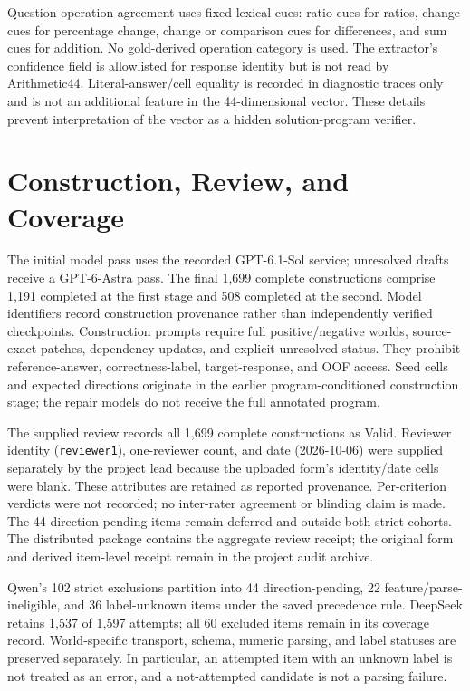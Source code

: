 Question-operation agreement uses fixed lexical cues: ratio cues for ratios, change cues for percentage change, change or comparison cues for differences, and sum cues for addition. No gold-derived operation category is used. The extractor's confidence field is allowlisted for response identity but is not read by Arithmetic44. Literal-answer/cell equality is recorded in diagnostic traces only and is not an additional feature in the 44-dimensional vector. These details prevent interpretation of the vector as a hidden solution-program verifier.

\section{Construction, Review, and Coverage}
\label{app:construction}
The initial model pass uses the recorded GPT-6.1-Sol service; unresolved drafts receive a GPT-6-Astra pass. The final 1,699 complete constructions comprise 1,191 completed at the first stage and 508 completed at the second. Model identifiers record construction provenance rather than independently verified checkpoints. Construction prompts require full positive/negative worlds, source-exact patches, dependency updates, and explicit unresolved status. They prohibit reference-answer, correctness-label, target-response, and OOF access. Seed cells and expected directions originate in the earlier program-conditioned construction stage; the repair models do not receive the full annotated program.

The supplied review records all 1,699 complete constructions as Valid. Reviewer identity (\texttt{reviewer1}), one-reviewer count, and date (2026-10-06) were supplied separately by the project lead because the uploaded form's identity/date cells were blank. These attributes are retained as reported provenance. Per-criterion verdicts were not recorded; no inter-rater agreement or blinding claim is made. The 44 direction-pending items remain deferred and outside both strict cohorts. The distributed package contains the aggregate review receipt; the original form and derived item-level receipt remain in the project audit archive.

\label{app:coverage}


Qwen's 102 strict exclusions partition into 44 direction-pending, 22 feature/parse-ineligible, and 36 label-unknown items under the saved precedence rule. DeepSeek retains 1,537 of 1,597 attempts; all 60 excluded items remain in its coverage record. World-specific transport, schema, numeric parsing, and label statuses are preserved separately. In particular, an attempted item with an unknown label is not treated as an error, and a not-attempted candidate is not a parsing failure.

